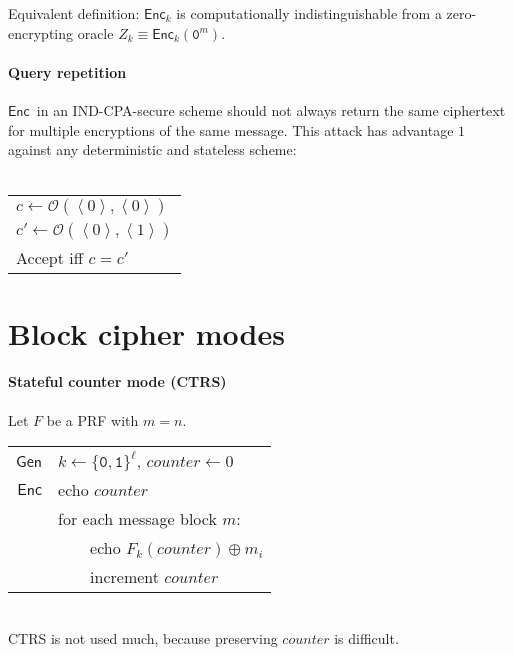\documentclass[11pt]{article}
\newcommand{\eqdef}{\ensuremath{\equiv}}
\newcommand{\Gen}{\ensuremath{\mathsf{Gen}}}
\newcommand{\Enc}{\ensuremath{\mathsf{Enc}}}
\newcommand{\bit}{\ensuremath{\{\texttt{0},\texttt{1}\}}}
\newcommand{\ang}[1]{\ensuremath{\left\langle#1\right\rangle}}
\theoremstyle{remark}
\begin{document}
Equivalent definition:
$\Enc_k$ is computationally indistinguishable from
a zero-encrypting oracle $Z_k \eqdef \Enc_k(\texttt{0}^m)$.

\paragraph{Query repetition}
\Enc\ in an IND-CPA-secure scheme should not always return the same ciphertext
for multiple encryptions of the same message.
This attack has advantage $1$ against any deterministic and stateless scheme:
\\~\\
\begin{tabular}{|l}
$c \leftarrow \mathcal{O}(\ang{0}, \ang{0})$\\
$c' \leftarrow \mathcal{O}(\ang{0}, \ang{1})$\\
Accept iff $c = c'$
\end{tabular}

\section{Block cipher modes}

\paragraph{Stateful counter mode (CTRS)}
Let $F$ be a PRF with $m = n$.
~\\[5pt]
\begin{tabular}{r|l}
\Gen & $k \leftarrow \bit^\ell$, $counter \leftarrow 0$ \\[5pt]
\Enc & echo $counter$ \\
     & for each message block $m$: \\
     & ~~~~echo $F_k(counter) \oplus m_i$ \\
     & ~~~~increment $counter$
\end{tabular}\\

CTRS is not used much, because preserving $counter$ is difficult.
\end{document}
